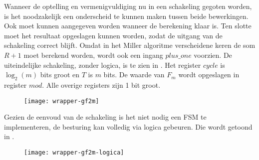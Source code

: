 Wanneer de optelling en vermenigvuldiging nu in een schakeling gegoten worden, is het noodzakelijk een onderscheid te kunnen maken tussen beide bewerkingen. Ook moet kunnen aangegeven worden wanneer de berekening klaar is. Ten slotte moet het resultaat opgeslagen kunnen worden, zodat de uitgang van de schakeling correct blijft. Omdat in het Miller algoritme verscheidene keren de som $R + 1$ moet berekend worden, wordt ook een ingang $plus\_one$ voorzien. De uiteindelijke schakeling, zonder logica, is te zien in . Het register $cycle$ is $\log _2 (m)$ bits groot en $T$ is $m$ bits. De waarde van $F_m$ wordt opgeslagen in register $mod$. Alle overige registers zijn 1 bit groot.

\begin{figure}[h]
	\begin{center}
		\texttt{[image: wrapper-gf2m]}
		\label{figuur-implementatie-wrapper-gf2m}
	\end{center}
\end{figure}

Gezien de eenvoud van de schakeling is het niet nodig een FSM te implementeren, de besturing kan volledig via logica gebeuren. Die wordt getoond in .

\begin{figure}[h]
	\begin{center}
		\texttt{[image: wrapper-gf2m-logica]}
		\label{figuur-implementatie-wrapper-gf2m-logica}
	\end{center}
\end{figure}



